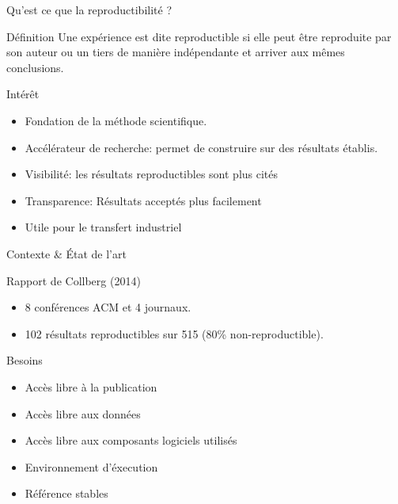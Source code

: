 \begin{frame}{Qu'est ce que la reproductibilité ?}

  \begin{block}{Définition}
    Une expérience est dite reproductible si elle peut être reproduite
    par son auteur ou un tiers de manière indépendante et arriver aux mêmes conclusions.
  \end{block}

  \begin{block}{Intérêt}
    \begin{itemize}
      \item Fondation de la méthode scientifique.
      \item Accélérateur de recherche: permet de construire sur des résultats établis.
      \item Visibilité: les résultats reproductibles sont plus cités
      \item Transparence: Résultats acceptés plus facilement
      \item Utile pour le transfert industriel
    \end{itemize}
  \end{block}

\end{frame}

\begin{frame}{Contexte \& État de l'art}

\begin{block}{Rapport de Collberg (2014)}
	\begin{itemize}
		\item 8 conférences ACM et 4 journaux.
		\item 102 résultats reproductibles sur 515 (80\% non-reproductible).
	\end{itemize}
\end{block}

	\begin{block}{Besoins}
  \begin{itemize}
  	\item Accès libre à la publication
  	\item Accès libre aux données
  	\item Accès libre aux composants logiciels utilisés
  	\item Environnement d'éxecution
  	\item Référence stables
  \end{itemize}
	\end{block}

\end{frame}

